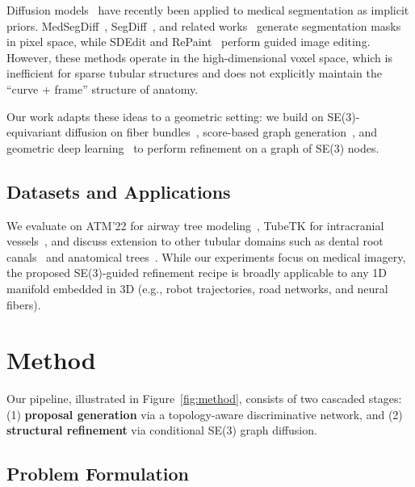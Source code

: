 \documentclass{article}
\begin{document}
Diffusion models~\cite{ho2020denoising,song2021score} have recently been applied to medical segmentation as implicit priors. MedSegDiff~\cite{wu2023medsegdiff}, SegDiff~\cite{amit2024segdiff}, and related works~\cite{wolleb2022diffusion} generate segmentation masks in pixel space, while SDEdit and RePaint~\cite{meng2022sdedit,lugmayr2022repaint} perform guided image editing. However, these methods operate in the high-dimensional voxel space, which is inefficient for sparse tubular structures and does not explicitly maintain the ``curve + frame'' structure of anatomy.

Our work adapts these ideas to a geometric setting: we build on SE(3)-equivariant diffusion on fiber bundles~\cite{yim2024se3,anonymous_icml}, score-based graph generation~\cite{jo2022score,vignac2023digress}, and geometric deep learning~\cite{bronstein2021geometric,geiger2022e3nn} to perform refinement on a graph of SE(3) nodes.

\subsection{Datasets and Applications}

We evaluate on ATM'22 for airway tree modeling~\cite{qin2024atm}, TubeTK for intracranial vessels~\cite{yang2021tubetk}, and discuss extension to other tubular domains such as dental root canals~\cite{persch2023toothfairy} and anatomical trees~\cite{wasserthal2023totalsegmentator,litjens2017survey}. While our experiments focus on medical imagery, the proposed SE(3)-guided refinement recipe is broadly applicable to any 1D manifold embedded in 3D (e.g., robot trajectories, road networks, and neural fibers).

\section{Method}

Our pipeline, illustrated in Figure~\ref{fig:method}, consists of two cascaded stages: (1) \textbf{proposal generation} via a topology-aware discriminative network, and (2) \textbf{structural refinement} via conditional SE(3) graph diffusion.

\subsection{Problem Formulation}
\end{document}
